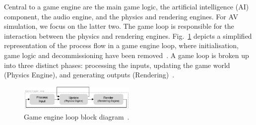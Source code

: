 \documentclass[letterpaper, 10 pt, journal, twoside]{IEEEtran}
\begin{document}

Central to a game engine are the main game logic, the artificial intelligence (AI) component, the audio engine, and the physics and rendering engines. For AV simulation, we focus on the latter two.
%
The game loop is responsible for the interaction between the physics and rendering engines. Fig.~\ref{GameEngineLoopDiagram} depicts a simplified representation of the process flow in a game engine loop, where  initialisation, game logic and decommissioning have been removed~\cite{unity_event_execution}.
A game loop is broken up into three distinct phases: processing the inputs, updating the game world (Physics Engine), and generating outputs (Rendering)~\cite{GameEngineArchBook}.

\begin{figure}[h]
\centering
\includegraphics[width=0.5\textwidth]{Other/Figures/GameEngineLoopv2.pdf}
\caption{Game engine loop block diagram~\cite{GameProgPatternsBook}.}
\label{GameEngineLoopDiagram}
\end{figure}



\end{document}
